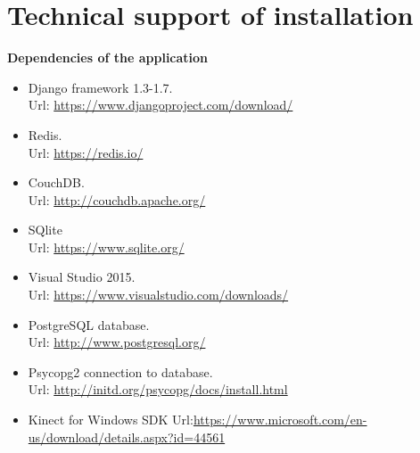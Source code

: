 \chapter{Technical support of installation}\label{appendixa}
\textbf{\large{Dependencies of the application}}
\begin{itemize}
\item Django framework 1.3-1.7.\\ Url: 
\url{https://www.djangoproject.com/download/}
\item Redis. \\
Url: \url{https://redis.io/}
\item CouchDB. \\
Url: \url{http://couchdb.apache.org/}
\item SQlite \\
Url: \url{https://www.sqlite.org/}
\item Visual Studio 2015. \\
Url: \url{https://www.visualstudio.com/downloads/}
\item PostgreSQL database. 
\\Url: \url{http://www.postgresql.org/}
\item Psycopg2 connection to database. \\
Url: \url{http://initd.org/psycopg/docs/install.html}
\item Kinect for Windows SDK 
Url:\url{https://www.microsoft.com/en-us/download/details.aspx?id=44561}
\end{itemize}
